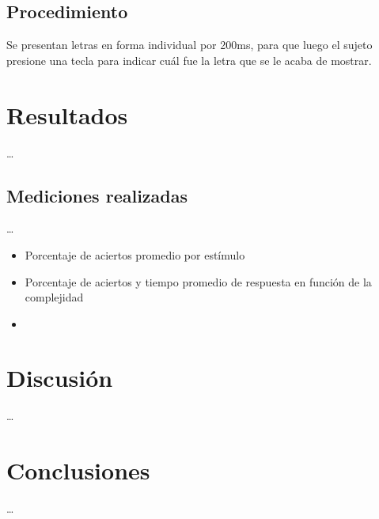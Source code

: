 \documentclass[runningheads,a4paper]{llncs}
\begin{document}
\subsection{Procedimiento}
Se presentan letras en forma individual por 200ms, para que luego el sujeto presione una tecla para indicar cuál fue la letra que se le acaba de mostrar.


\section{Resultados}
\ldots

\subsection{Mediciones realizadas}
\ldots
\begin{itemize}
 \item Porcentaje de aciertos promedio por estímulo
 \item Porcentaje de aciertos y tiempo promedio de respuesta en función de la complejidad
 \item 

\end{itemize}


\section{Discusi\'on}
\ldots

\section{Conclusiones}
\ldots


\newpage
\end{document}
